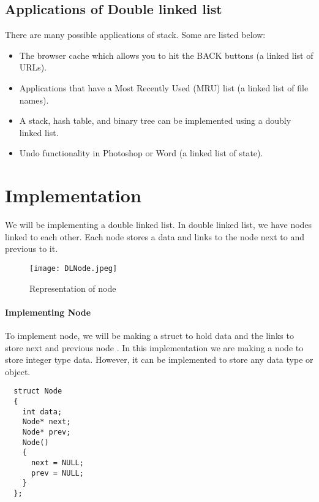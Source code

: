 \documentclass[11pt,fleqn]{book} %
\begin{document}
\subsection{Applications of Double linked list}
There are many possible applications of stack. Some are listed below:
\begin{itemize}
\item The browser cache which allows you to hit the BACK buttons (a linked list of URLs).
\item Applications that have a Most Recently Used (MRU) list (a linked list of file names).
\item A stack, hash table, and binary tree can be implemented using a doubly linked list. 
\item Undo functionality in Photoshop or Word (a linked list of state).
\end{itemize}

\section{Implementation}
We will be implementing a double linked list. In double linked list, we have nodes linked to each other.
Each node stores a data and links to the node next to and previous to it.
\begin{figure}[H]
  \centering
  \texttt{[image: DLNode.jpeg]}
  \caption{Representation of node}
\end{figure}
\paragraph{Implementing Node}
To implement node, we will be making a struct to hold data and the links to store next and previous node . In this implementation we are making a node to store integer type data. However, it can be implemented to store any data type or object.
\begin{lstlisting}
  struct Node
  {
    int data;
    Node* next;
    Node* prev;
    Node()
    {
      next = NULL;
      prev = NULL;
    }
  };
\end{lstlisting}
\end{document}

